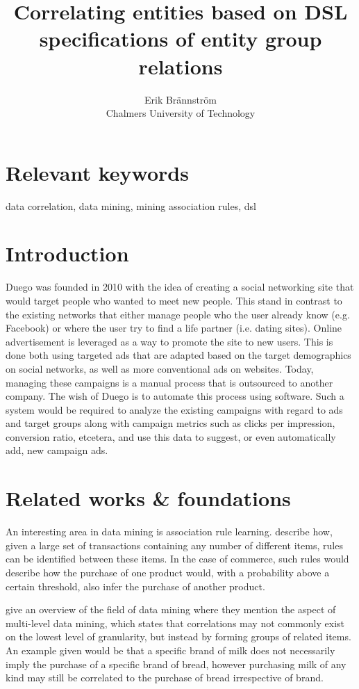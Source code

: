 \documentclass[a4paper]{article}
\begin{document}
\title{Correlating entities based on DSL specifications of entity group relations}
\author{Erik Brännström\\
  Chalmers University of Technology}
\date{}
\maketitle

\section{Relevant keywords}
data correlation, data mining, mining association rules, dsl

\section{Introduction}
Duego was founded in 2010 with the idea of creating a social networking site that would target people who wanted to meet new people. This stand in contrast to the existing networks that either manage people who the user already know (e.g. Facebook) or where the user try to find a life partner (i.e. dating sites).
Online advertisement is leveraged as a way to promote the site to new users. This is done both using targeted ads that are adapted based on the target demographics on social networks, as well as more conventional ads on websites. Today, managing these campaigns is a manual process that is outsourced to another company.
The wish of Duego is to automate this process using software. Such a system would be required to analyze the existing campaigns with regard to ads and target groups along with campaign metrics such as clicks per impression, conversion ratio, etcetera, and use this data to suggest, or even automatically add, new campaign ads.

\section{Related works \& foundations}
An interesting area in data mining is association rule learning. \citet{Agrawal1993} describe how, given a large set of transactions containing any number of different items, rules can be identified between these items. In the case of commerce, such rules would describe how the purchase of one product would, with a probability above a certain threshold, also infer the purchase of another product.

\citet{Chen1996} give an overview of the field of data mining where they mention the aspect of multi-level data mining, which states that correlations may not commonly exist on the lowest level of granularity, but instead by forming groups of related items. An example given would be that a specific brand of milk does not necessarily imply the purchase of a specific brand of bread, however purchasing milk of any kind may still be correlated to the purchase of bread irrespective of brand.
\end{document}
